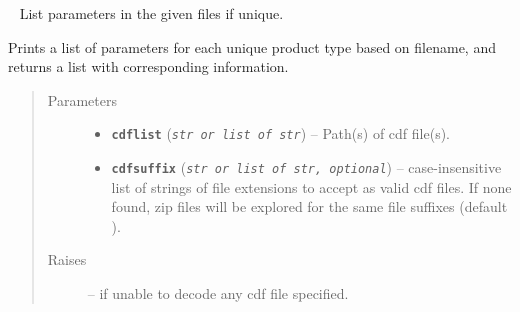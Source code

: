 \documentclass[letterpaper,10pt,english]{sphinxhowto}
\begin{document}

\begin{fulllineitems}
\label{swtools_doc:swtools.getCDFparamlist}~\label{swtools_doc:getcdfparamlist}
List parameters in the given files if unique.

Prints a list of parameters for each unique product type based on
filename, and returns a list with corresponding information.
\begin{quote}\begin{description}
\item[{Parameters}] \leavevmode\begin{itemize}
\item {} 
\textbf{\texttt{cdflist}} (\emph{\texttt{str or list of str}}) -- Path(s) of cdf file(s).

\item {} 
\textbf{\texttt{cdfsuffix}} (\emph{\texttt{str or list of str, optional}}) -- case-insensitive list of strings of file extensions to accept
as valid cdf files. If none found, zip files will be explored
for the same file suffixes (default ).

\end{itemize}

\item[{Raises}] \leavevmode
{} --
if unable to decode any cdf file specified.

\end{description}\end{quote}

\end{fulllineitems}

\end{document}
